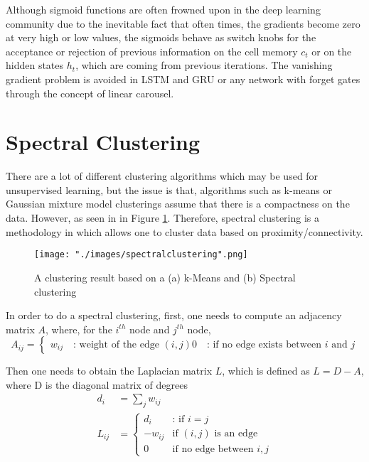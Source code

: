 \begin{appendices}
Although sigmoid functions are often frowned upon in the deep learning community due to the inevitable fact that often times, the gradients become zero at very high or low values, the sigmoids behave as switch knobs for the acceptance or rejection of previous information on the cell memory $c_t$ or on the hidden states $h_t$, which are coming from previous iterations. The vanishing gradient problem is avoided in LSTM and GRU or any network with forget gates through the concept of linear carousel.


\section{Spectral Clustering} \label{app:spectralclustering}

There are a lot of different clustering algorithms which may be used for unsupervised learning, but the issue is that, algorithms such as k-means or Gaussian mixture model clusterings assume that there is a compactness on the data. However, as seen in in Figure \ref{app::specclust}. Therefore, spectral clustering is a methodology in which allows one to cluster data based on proximity/connectivity.

\begin{figure}[H]
\begin{center}
    \texttt{[image: "./images/spectralclustering".png]}
    \caption{A clustering result based on a (a) k-Means and (b) Spectral clustering}
    \label{app::specclust}
\end{center}
\end{figure}


In order to do a spectral clustering, first, one needs to compute an adjacency matrix $A$, where, for the $i^{th}$ node and $j^{th}$ node,
\begin{equation*}
    A_{ij} = \begin{cases}
                w_{ij}   \quad \text{: weight of the edge $(i,j)$}
                0        \quad \text{: if no edge exists between $i$ and $j$}
            \end{cases}
\end{equation*}

Then one needs to obtain the Laplacian matrix $L$, which is defined as $L=D-A$, where D is the diagonal matrix of degrees
\begin{align*}
    d_i &= \sum_j w_{ij} \\
    L_{ij} &= \begin{cases}
    d_i &\text{: if $i=j$} \\
    -w_{ij} &\text{if $(i,j)$ is an edge} \\
    0 &\text{if no edge between $i,j$}
    \end{cases}
\end{align*}


\end{appendices}
